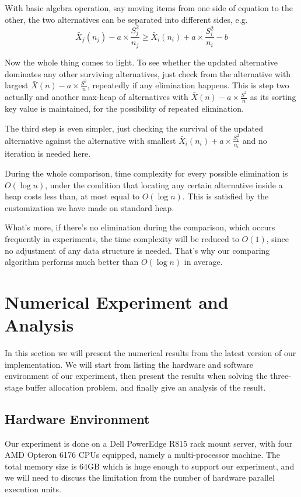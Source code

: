 \documentclass[12pt,a4]{report}
\begin{document}
With basic algebra operation, say moving items from one side of equation to the other, the two alternatives can be separated into different sides, e.g.
$$ \bar{X}_j(n_j) - a \times \frac{S_j^2}{n_j} \ge \bar{X}_i(n_i) + a \times \frac{S_i^2}{n_i} - b $$

Now the whole thing comes to light. To see whether the updated alternative dominates any other surviving alternatives, just check from the alternative with largest $\bar{X}(n) - a \times \frac{S^2}{n}$, repeatedly if any elimination happens. This is step two actually and another max-heap of alternatives with $\bar{X}(n) - a \times \frac{S^2}{n}$ as its sorting key value is maintained, for the possibility of repeated elimination.

The third step is even simpler, just checking the survival of the updated alternative against the alternative with smallest $\bar{X}_i(n_i) + a \times \frac{S_i^2}{n_i}$ and no iteration is needed here.

During the whole comparison, time complexity for every possible elimination is $O(\log n)$, under the condition that locating any certain alternative inside a heap costs less than, at most equal to $O(\log n)$. This is satisfied by the customization we have made on standard heap.

What's more, if there's no elimination during the comparison, which occurs frequently in experiments, the time complexity will be reduced to $O(1)$, since no adjustment of any data structure is needed. That's why our comparing algorithm performs much better than $O(\log n)$ in average.

\chapter{Numerical Experiment and Analysis}

In this section we will present the numerical results from the latest version of our implementation. We will start from listing the hardware and software environment of our experiment, then present the results when solving the three-stage buffer allocation problem, and finally give an analysis of the result.

\section{Hardware Environment}

Our experiment is done on a Dell PowerEdge R815 rack mount server, with four AMD Opteron 6176 CPUs equipped, namely a multi-processor machine. The total memory size is 64GB which is huge enough to support our experiment, and we will need to discuss the limitation from the number of hardware parallel execution units.
\end{document}
